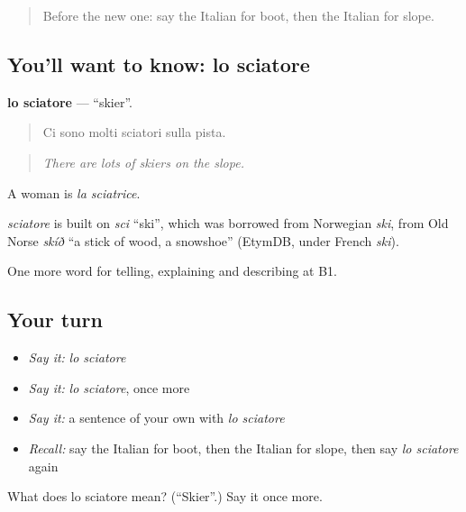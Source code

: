 \begin{quote}
Before the new one: say the Italian for boot, then the Italian for slope.
\end{quote}

\subsection*{You'll want to know: lo sciatore}
\textbf{lo sciatore} — \textquotedblleft{}skier\textquotedblright{}.

\begin{quote}
Ci sono molti sciatori sulla pista.
\end{quote}

\begin{quote}
\emph{There are lots of skiers on the slope.}
\end{quote}

A woman is \emph{la sciatrice}.

\begin{cousinweb}
\emph{sciatore} is built on \emph{sci} \textquotedblleft{}ski\textquotedblright{}, which was borrowed from Norwegian \emph{ski}, from Old Norse \emph{skíð} \textquotedblleft{}a stick of wood, a snowshoe\textquotedblright{} (EtymDB, under French \emph{ski}).
\end{cousinweb}

\begin{grammarlens}[title={What you've built}]
One more word for telling, explaining and describing at B1.
\end{grammarlens}

\subsection*{Your turn}
\begin{itemize}
\raggedright
  \item \emph{Say it:} \emph{lo sciatore}
  \item \emph{Say it:} \emph{lo sciatore}, once more
  \item \emph{Say it:} a sentence of your own with \emph{lo sciatore}
  \item \emph{Recall:} say the Italian for boot, then the Italian for slope, then say \emph{lo sciatore} again
\end{itemize}

\begin{tcolorbox}[breakable,colback=teal!4,colframe=teal!35!black,title={Before you move on}]
What does lo sciatore mean? (\textquotedblleft{}Skier\textquotedblright{}.) Say it once more.
\end{tcolorbox}
